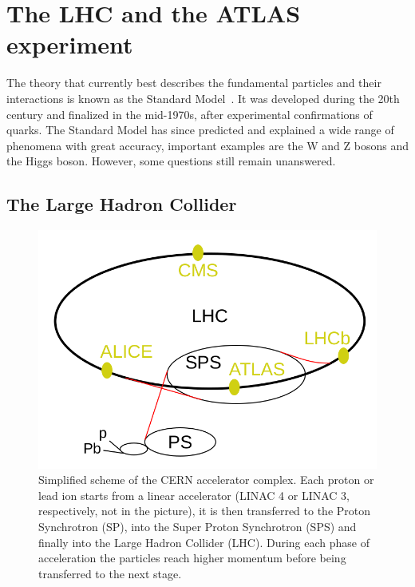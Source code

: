 
\chapter{The LHC and the ATLAS experiment}\label{chap:LHC_ATLAS}

The theory that currently best describes the fundamental particles and their interactions is known as the Standard Model~\cite{Herrero1999}. It was developed during the 20th century and finalized in the mid-1970s, after experimental confirmations of quarks. The Standard Model has since predicted and explained a wide range of phenomena with great accuracy, important examples are the W and Z bosons and the Higgs boson. However, some questions still remain unanswered.


\section{The Large Hadron Collider}
\begin{figure}[h!tbp]
    \centering
    \includegraphics[width=.7\linewidth]{Images/intro/LHC.png}
    \captionsetup{width=\captionwidth}
    \caption{Simplified scheme of the CERN accelerator complex. Each proton or lead ion starts from a linear accelerator (LINAC 4 or LINAC 3, respectively, not in the picture), it is then transferred to the Proton Synchrotron (SP), into the Super Proton Synchrotron (SPS) and finally into the Large Hadron Collider (LHC). During each phase of acceleration the particles reach higher momentum before being transferred to the next stage.}
    \label{fig:LHC}
\end{figure}


